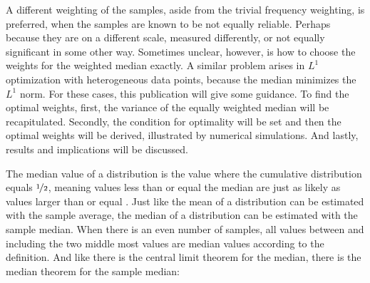 \documentclass[ejs]{imsart}
\numberwithin{equation}{section}
\theoremstyle{plain}
\begin{document}
A different weighting of the samples, aside from the trivial frequency weighting, is preferred, when the samples are known to be not equally reliable.
Perhaps because they are on a different scale, measured differently, or not equally significant in some other way.
Sometimes unclear, however, is how to choose the weights for the weighted median exactly.
A similar problem arises in $L^1$ optimization with heterogeneous data points, because the median minimizes the $L^1$ norm.
For these cases, this publication will give some guidance.
To find the optimal weights, first, the variance of the equally weighted median will be recapitulated.
Secondly, the condition for optimality will be set and then the optimal weights will be derived, illustrated by numerical simulations.
And lastly, results and implications will be discussed.

The median value of a distribution is the value where the cumulative distribution equals $\nicefrac{1}{2}$, meaning values less than or equal the median are just as likely as values larger than or equal \cite[Chap.~2.8]{kendall1945}.
Just like the mean of a distribution can be estimated with the sample average, the median of a distribution can be estimated with the sample median.
When there is an even number of samples, all values between and including the two middle most values are median values according to the definition.
And like there is the central limit theorem for the median, there is the median theorem for the sample median:
\end{document}
